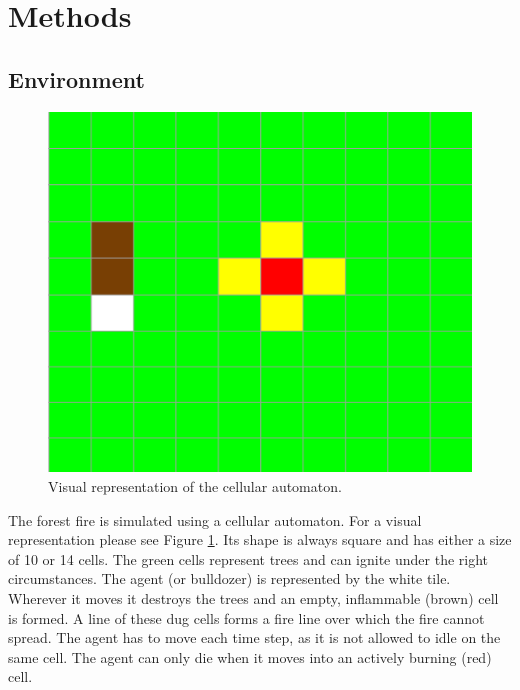 
\section{Methods}\label{sec:methods}

\subsection{Environment}\label{sec:environment}
\begin{figure}[h]
    \centering
    \includegraphics[width=\linewidth]{img/Simulation.png}
    \caption{Visual representation of the cellular automaton.}
    \label{fig:simulation}
\end{figure}
The forest fire is simulated using a cellular automaton. For a visual representation please see Figure \ref{fig:simulation}. Its shape is always square and has either a size of 10 or 14 cells. The green cells represent trees and can ignite under the right circumstances.
The agent (or bulldozer) is represented by the white tile. Wherever it moves it destroys the trees and an empty, inflammable (brown) cell is formed. A line of these dug cells forms a fire line over which the fire cannot spread. The agent has to move each time step, as it is not allowed to idle on the same cell. The agent can only die when it moves into an actively burning (red) cell.

